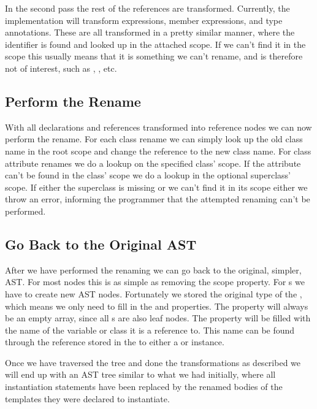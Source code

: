 In the second pass the rest of the references are transformed.
Currently, the implementation will transform  expressions, member expressions, and type annotations.
These are all transformed in a pretty similar manner, where the identifier is found and looked up in the attached scope.
If we can't find it in the scope this usually means that it is something we can't rename, and is therefore not of interest, such as , , etc.

\subsection{Perform the Rename}\label{subsec:performing-the-rename}

With all declarations and references transformed into reference nodes we can now perform the rename.
For each class rename we can simply look up the old class name in the root scope and change the reference to the new class name.
For class attribute renames we do a lookup on the specified class' scope.
If the attribute can't be found in the class' scope we do a lookup in the optional superclass' scope.
If either the superclass is missing or we can't find it in its scope either we throw an error, informing the programmer that the attempted renaming can't be performed.

\subsection{Go Back to the Original AST}\label{subsec:going-back-to-the-original-ast}

After we have performed the renaming we can go back to the original, simpler, AST\@.
For most nodes this is as simple as removing the scope property.
For s we have to create new AST nodes.
Fortunately we stored the original type of the , which means we only need to fill in the  and  properties.
The  property will always be an empty array, since all s are also leaf nodes.
The  property will be filled with the name of the variable or class it is a reference to.
This name can be found through the reference stored in the  to either a  or  instance.

Once we have traversed the tree and done the transformations as described we will end up with an AST tree similar to what we had initially, where all instantiation statements have been replaced by the renamed bodies of the templates they were declared to instantiate.

